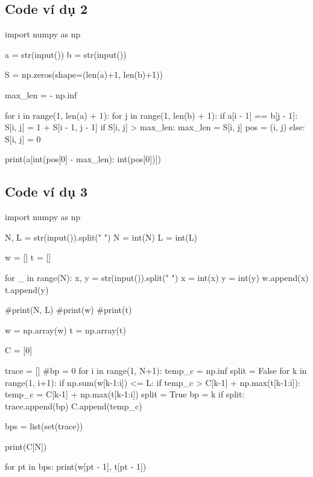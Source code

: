 \documentclass[14pt, a4paper]{article}
\theoremstyle{sltheorem}
\theoremstyle{soltheorem}
\begin{document}
    \subsection{Code ví dụ 2} \label{code-2-ex-1}

    \begin{python}

import numpy as np
        
a = str(input())
b = str(input())
        
        
S = np.zeros(shape=(len(a)+1, len(b)+1))
        
max_len = - np.inf
        
for i in range(1, len(a) + 1):
    for j in range(1, len(b) + 1):
        if a[i - 1] == b[j - 1]:
            S[i, j] = 1 + S[i - 1, j - 1]
            if S[i, j] > max_len:
                max_len = S[i, j]
                pos = (i, j)
        else:
            S[i, j] = 0
        
        
print(a[int(pos[0] - max_len): int(pos[0])])

    \end{python}

    \subsection{Code ví dụ 3} \label{code-3-ex-1}

    \begin{python}
import numpy as np
        
N, L = str(input()).split(" ")
N = int(N)
L = int(L)
                    
w = []
t = []
                    
for _ in range(N):
    x, y = str(input()).split(" ")
    x = int(x)
    y = int(y)
    w.append(x)
    t.append(y)
                    
#print(N, L)
#print(w)
#print(t)
                    
w = np.array(w)
t = np.array(t)
                    
C = [0]
                    
trace = []
#bp = 0
for i in range(1, N+1):
    temp_c = np.inf
    split = False
    for k in range(1, i+1):
        if np.sum(w[k-1:i]) <= L:
            if temp_c > C[k-1] + np.max(t[k-1:i]):
                temp_c = C[k-1] + np.max(t[k-1:i])
                split = True
                bp = k
    if split:
        trace.append(bp)
    C.append(temp_c)
                    
bps = list(set(trace))
                    
print(C[N])
                    
for pt in bps:
    print(w[pt - 1], t[pt - 1])
        \end{python}
\end{document}
